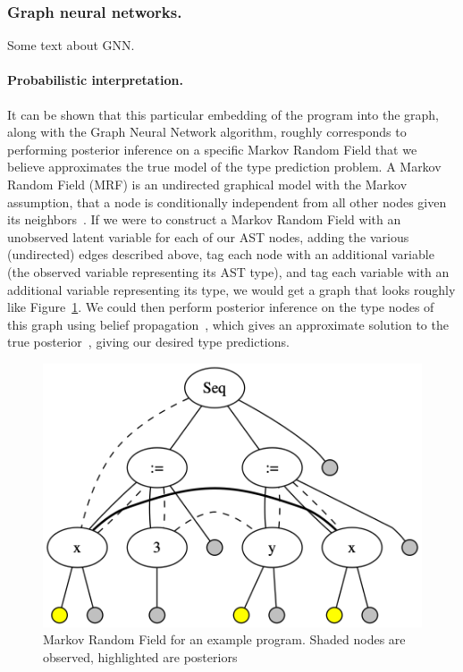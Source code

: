 \subsubsection{Graph neural networks.} Some text about GNN.


\paragraph{Probabilistic interpretation.}
It can be shown that this particular embedding of the program into the graph, along with the Graph Neural Network algorithm, roughly corresponds to performing posterior inference on a specific Markov Random Field that we believe approximates the true model of the type prediction problem.
A Markov Random Field (MRF) is an undirected graphical model with the Markov assumption, that a node is conditionally independent from all other nodes given its neighbors~\cite{kinderman80markov}.
If we were to construct a Markov Random Field with an unobserved latent variable for each of our AST nodes, adding the various (undirected) edges described above, tag each node with an additional variable (the observed variable representing its AST type), and tag each variable with an additional variable representing its type, we would get a graph that looks roughly like Figure~\ref{fig:mrf-graph}.
We could then perform posterior inference on the type nodes of this graph using belief propagation~\cite{pearl2009causality}, which gives an approximate solution to the true posterior~\cite{weiss2000correctness}, giving our desired type predictions.
\begin{figure}
	\centering
	\includegraphics[width=\linewidth]{img/mrf_graph}
	\caption{Markov Random Field for an example program. Shaded nodes are observed, highlighted are posteriors}
	\label{fig:mrf-graph}
\end{figure}

